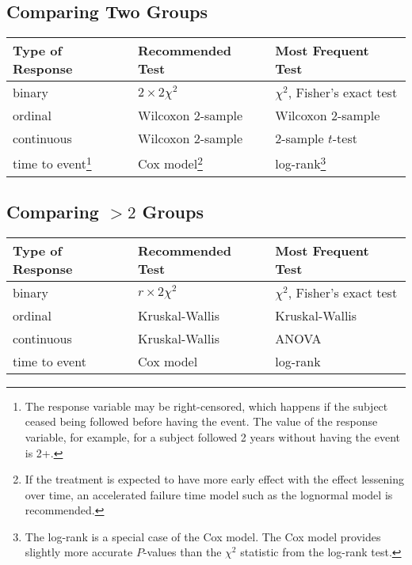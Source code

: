 \subsection{Comparing Two Groups}
\begin{minipage}{\textwidth}
\begin{center}\begin{tabular}{lll} \hline
Type of Response & Recommended Test & Most Frequent Test \\ \hline
binary     & $2\times 2 \chi^{2}$ & $\chi^{2}$, Fisher's exact test \\
ordinal    & Wilcoxon 2-sample & Wilcoxon 2-sample \\
continuous & Wilcoxon 2-sample & 2-sample $t$-test \\
time to event\footnote{The response variable may be
  right-censored, which happens if the subject ceased being followed
     before having the event.  The value of the response variable, for
   example, for a subject followed 2 years without having the event is
   2+.} & Cox model\footnote{If the treatment is expected to have more
   early effect with the effect lessening over time, an accelerated
   failure time model such as the lognormal model is recommended.}&
 log-rank\footnote{The log-rank is a special case 
   of the Cox model.  The Cox model provides slightly more accurate
   $P$-values than the $\chi^2$ statistic from the log-rank test.} \\
 \hline
\end{tabular}\end{center}\end{minipage}

\subsection{Comparing $>2$ Groups}
\begin{center}\begin{tabular}{lll} \hline
Type of Response & Recommended Test & Most Frequent Test \\ \hline
binary     & $r\times 2 \chi^{2}$ & $\chi^{2}$, Fisher's exact test \\
ordinal    & Kruskal-Wallis & Kruskal-Wallis \\
continuous & Kruskal-Wallis & ANOVA \\
time to event & Cox model & log-rank \\ \hline
\end{tabular}\end{center}

